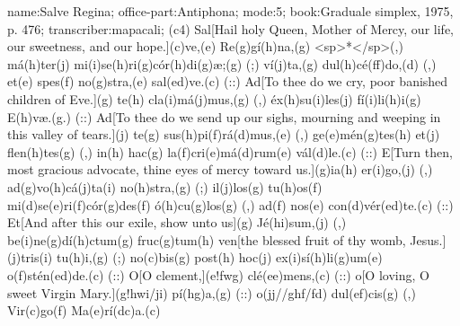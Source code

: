 name:Salve Regina;
office-part:Antiphona;
mode:5;
book:Graduale simplex, 1975, p. 476;
transcriber:mapacali;
(c4) Sal[Hail holy Queen, Mother of Mercy, our life, our sweetness, and our hope.](c)ve,(e) Re(g)gí(h)na,(g) <sp>*</sp>(,) má(h)ter(j) mi(i)se(h)ri(g)cór(h)di(g)æ;(g) (;) ví(j)ta,(g) dul(h)cé(ff)do,(d) (,) et(e) spes(f) no(g)stra,(e) sal(ed)ve.(c) (::) Ad[To thee do we cry, poor banished children of Eve.](g) te(h) cla(i)má(j)mus,(g) (,) éx(h)su(i)les(j) fí(i)li(h)i(g) E(h)væ.(g.) (::) Ad[To thee do we send up our sighs, mourning and weeping in this valley of tears.](j) te(g) sus(h)pi(f)rá(d)mus,(e) (,) ge(e)mén(g)tes(h) et(j) flen(h)tes(g) (,) in(h) hac(g) la(f)cri(e)má(d)rum(e) vál(d)le.(c) (::) E[Turn then, most gracious advocate, thine eyes of mercy toward us.](g)ia(h) er(i)go,(j) (,) ad(g)vo(h)cá(j)ta(i) no(h)stra,(g) (;) il(j)los(g) tu(h)os(f) mi(d)se(e)ri(f)cór(g)des(f) ó(h)cu(g)los(g) (,) ad(f) nos(e) con(d)vér(ed)te.(c) (::) Et[And after this our exile, show unto us](g) Jé(hi)sum,(j) (,) be(i)ne(g)dí(h)ctum(g) fruc(g)tum(h) ven[the blessed fruit of thy womb, Jesus.](j)tris(i) tu(h)i,(g) (;) no(c)bis(g) post(h) hoc(j) ex(i)sí(h)li(g)um(e) o(f)stén(ed)de.(c) (::) O[O clement,](e!fwg) clé(ee)mens,(c) (::) o[O loving, O sweet Virgin Mary.](g!hwi/ji) pí(hg)a,(g) (::) o(jj//ghf/fd) dul(ef)cis(g) (,) Vir(c)go(f) Ma(e)rí(dc)a.(c) 